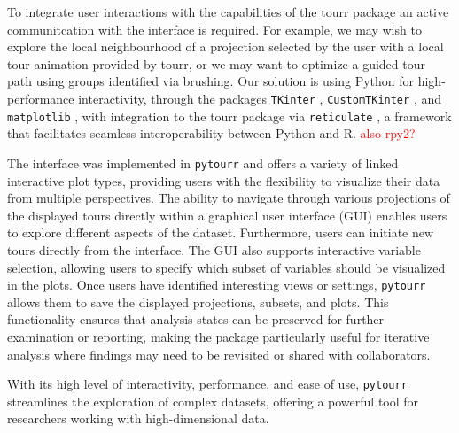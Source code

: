 \documentclass[article]{ajs}
\begin{document}
To integrate user interactions with the capabilities of the tourr package an active communitcation with the interface is required. For example, we may wish to explore the local neighbourhood of a projection selected by the user with a local tour animation provided by tourr, or we may want to optimize a guided tour path using groups identified via brushing.
Our solution is using Python for high-performance interactivity, through the packages \texttt{TKinter} \citep{lundh1999introduction}, \texttt{CustomTKinter} \citep{schimansky24}, and \texttt{matplotlib} \citep{Hunter:2007}, with integration to the tourr package \citep{tourr} via \texttt{reticulate} \citep{reticulate}, a framework that facilitates seamless interoperability between Python and R.
\textcolor{red}{also rpy2?}


The interface was implemented in \texttt{pytourr} and offers a variety of linked interactive plot types, providing users with the flexibility to visualize their data from multiple perspectives. The ability to navigate through various projections of the displayed tours directly within a graphical user interface (GUI) enables users to explore different aspects of the dataset. Furthermore, users can initiate new tours directly from the interface. The GUI also supports interactive variable selection, allowing users to specify which subset of variables should be visualized in the plots. Once users have identified interesting views or settings, \texttt{pytourr} allows them to save the displayed projections, subsets, and plots. This functionality ensures that analysis states can be preserved for further examination or reporting, making the package particularly useful for iterative analysis where findings may need to be revisited or shared with collaborators.

With its high level of interactivity, performance, and ease of use, \texttt{pytourr} streamlines the exploration of complex datasets, offering a powerful tool for researchers working with high-dimensional data.
\end{document}
